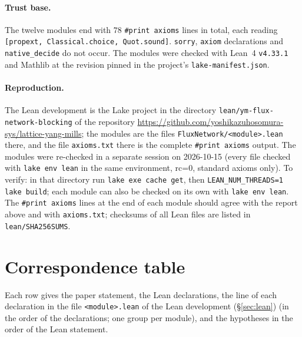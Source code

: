 \documentclass[11pt,a4paper]{article}
\theoremstyle{definition}
\theoremstyle{remark}
\newcommand{\code}[1]{\texttt{#1}}
\begin{document}
\paragraph{Trust base.}
{\sloppy The twelve modules end with $78$ \code{\#print axioms} lines in total, each reading \code{[propext, Classical.choice, Quot.sound]}. \code{sorry}, \code{axiom} declarations and \code{native\_decide} do not occur. The modules were checked with Lean~4 \code{v4.33.1} and Mathlib at the revision pinned in the project's \code{lake-\allowbreak{}manifest.json}.\par}

\paragraph{Reproduction.}
{\sloppy The Lean development is the Lake project in the directory \code{lean/ym-flux-network-blocking} of the repository \url{https://github.com/yoshikazuhosomura-sys/lattice-yang-mills}; the modules are the files \code{FluxNetwork/<module>.lean} there, and the file \code{axioms.txt} there is the complete \code{\#print axioms} output. The modules were re-checked in a separate session on 2026-10-15 (every file checked with \code{lake env lean} in the same environment, rc=0, standard axioms only).
To verify: in that directory run \code{lake exe cache get}, then \code{LEAN\_NUM\_THREADS=1 lake build}; each module can also be checked on its own with \code{lake env lean}. The \code{\#print axioms} lines at the end of each module should agree with the report above and with \code{axioms.txt}; checksums of all Lean files are listed in \code{lean/SHA256SUMS}.\par}

\section{Correspondence table}\label{sec:corr}
Each row gives the paper statement, the Lean declarations, the line of each declaration in the file \code{<module>.lean} of the Lean development (\S\ref{sec:lean}) (in the order of the declarations; one group per module), and the hypotheses in the order of the Lean statement.
\end{document}
